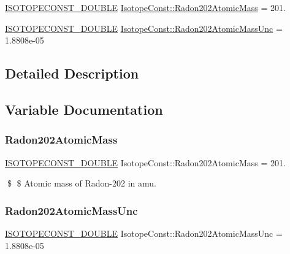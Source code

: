 \begin{DoxyCompactItemize}
\item 
\mbox{\hyperlink{group___isotope_const-_macros_ga8f45a7272ce02c0b4c65c44636ed719a}{I\+S\+O\+T\+O\+P\+E\+C\+O\+N\+S\+T\+\_\+\+D\+O\+U\+B\+LE}} \mbox{\hyperlink{group___isotope_const-_radon-_rn202_ga7d738788f10ed1bb55f16792fb946c42}{Isotope\+Const\+::\+Radon202\+Atomic\+Mass}} = 201.
\item 
\mbox{\hyperlink{group___isotope_const-_macros_ga8f45a7272ce02c0b4c65c44636ed719a}{I\+S\+O\+T\+O\+P\+E\+C\+O\+N\+S\+T\+\_\+\+D\+O\+U\+B\+LE}} \mbox{\hyperlink{group___isotope_const-_radon-_rn202_gaf78fba69e051aca9476e551a8dcff10b}{Isotope\+Const\+::\+Radon202\+Atomic\+Mass\+Unc}} = 1.\+8808e-\/05
\end{DoxyCompactItemize}


\subsection{Detailed Description}


\subsection{Variable Documentation}
\mbox{\label{group___isotope_const-_radon-_rn202_ga7d738788f10ed1bb55f16792fb946c42}} 
\subsubsection{\texorpdfstring{Radon202\+Atomic\+Mass}{Radon202AtomicMass}}
{\footnotesize\ttfamily \mbox{\hyperlink{group___isotope_const-_macros_ga8f45a7272ce02c0b4c65c44636ed719a}{I\+S\+O\+T\+O\+P\+E\+C\+O\+N\+S\+T\+\_\+\+D\+O\+U\+B\+LE}} Isotope\+Const\+::\+Radon202\+Atomic\+Mass = 201.}

\$ \$ Atomic mass of Radon-\/202 in amu. \mbox{\label{group___isotope_const-_radon-_rn202_gaf78fba69e051aca9476e551a8dcff10b}} 
\subsubsection{\texorpdfstring{Radon202\+Atomic\+Mass\+Unc}{Radon202AtomicMassUnc}}
{\footnotesize\ttfamily \mbox{\hyperlink{group___isotope_const-_macros_ga8f45a7272ce02c0b4c65c44636ed719a}{I\+S\+O\+T\+O\+P\+E\+C\+O\+N\+S\+T\+\_\+\+D\+O\+U\+B\+LE}} Isotope\+Const\+::\+Radon202\+Atomic\+Mass\+Unc = 1.\+8808e-\/05}

